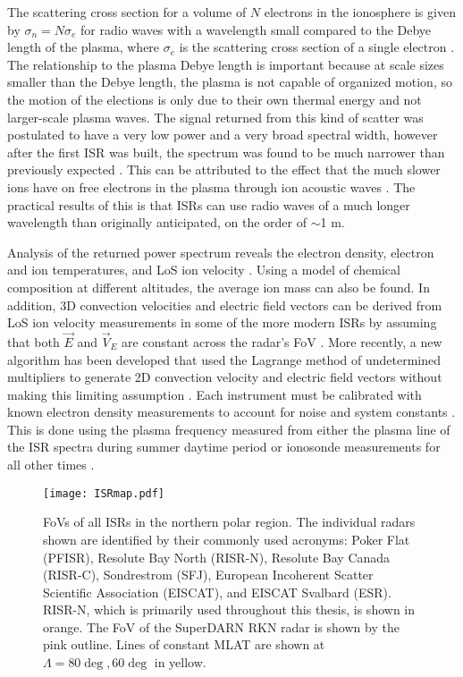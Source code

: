 The scattering cross section for a volume of \(N\) electrons in the ionosphere is given by \(\sigma_n = N \sigma_e\) for radio waves with a wavelength small compared to the Debye length of the plasma, where \(\sigma_e\) is the scattering cross section of a single electron \citep{Gordon1958,Fejer1960}.  The relationship to the plasma Debye length is important because at scale sizes smaller than the Debye length, the plasma is not capable of organized motion, so the motion of the elections is only due to their own thermal energy and not larger-scale plasma waves.  The signal returned from this kind of scatter was postulated to have a very low power and a very broad spectral width, however after the first ISR was built, the spectrum was found to be much narrower than previously expected \citep{Evans1969}.  This can be attributed to the effect that the much slower ions have on free electrons in the plasma through ion acoustic waves \citep{Bowles1958}.  The practical results of this is that ISRs can use radio waves of a much longer wavelength than originally anticipated, on the order of \(\sim\)1 m.

Analysis of the returned power spectrum reveals the electron density, electron and ion temperatures, and LoS ion velocity \citep{Evans1969,Rishbeth1985,Nicolls2007a}.  Using a model of chemical composition at different altitudes, the average ion mass can also be found.  In addition, 3D convection velocities and electric field vectors can be derived from LoS ion velocity measurements in some of the more modern ISRs by assuming that both \(\vec{E}\) and \(\vec{V}_E\) are constant across the radar's FoV \citep{Heinselman2008}.  More recently, a new algorithm has been developed that used the Lagrange method of undetermined multipliers to generate 2D convection velocity and electric field vectors without making this limiting assumption \citep{Nicolls2014}.  Each instrument must be calibrated with known electron density measurements to account for noise and system constants \citep{Nicolls2007a}.  This is done using the plasma frequency measured from either the plasma line of the ISR spectra during summer daytime period or ionosonde measurements for all other times \citep{Bahcivan2010,Themens2014}.

\begin{figure}
	\centering
	\texttt{[image: ISRmap.pdf]}
	\caption[ISR map]{FoVs of all ISRs in the northern polar region.  The individual radars shown are identified by their commonly used acronyms: Poker Flat (PFISR), Resolute Bay North (RISR-N), Resolute Bay Canada (RISR-C), Sondrestrom (SFJ), European Incoherent Scatter Scientific Association (EISCAT), and EISCAT Svalbard (ESR).  RISR-N, which is primarily used throughout this thesis, is shown in orange.  The FoV of the SuperDARN RKN radar is shown by the pink outline.  Lines of constant MLAT are shown at \(\Lambda=80\deg,60\deg\) in yellow.}
	\label{fig:isrmap}
\end{figure}

